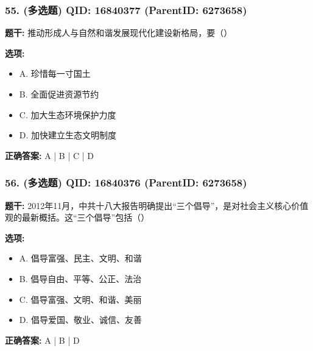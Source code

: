 \documentclass[12pt,UTF8]{ctexart}
\begin{document}
\subsubsection*{55. (多选题) \small QID: 16840377 (ParentID: 6273658)}

\textbf{题干:}
推动形成人与自然和谐发展现代化建设新格局，要（）



\textbf{选项:}
\begin{itemize}[leftmargin=*]

  \item A. 珍惜每一寸国土

  \item B. 全面促进资源节约

  \item C. 加大生态环境保护力度

  \item D. 加快建立生态文明制度

\end{itemize}

\textbf{正确答案:}
A | B | C | D

\vspace{0.3em}\hrulefill\vspace{0.7em}

\subsubsection*{56. (多选题) \small QID: 16840376 (ParentID: 6273658)}

\textbf{题干:}
2012年11月，中共十八大报告明确提出“三个倡导”，是对社会主义核心价值观的最新概括。这“三个倡导”包括（）



\textbf{选项:}
\begin{itemize}[leftmargin=*]

  \item A. 倡导富强、民主、文明、和谐

  \item B. 倡导自由、平等、公正、法治

  \item C. 倡导富强、文明、和谐、美丽

  \item D. 倡导爱国、敬业、诚信、友善

\end{itemize}

\textbf{正确答案:}
A | B | D

\vspace{0.3em}\hrulefill\vspace{0.7em}
\end{document}

